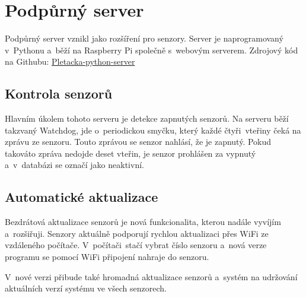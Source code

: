 \chapter{Podpůrný server}
Podpůrný server vznikl jako rozšíření pro senzory.
Server je naprogramovaný v~Pythonu a~běží na Raspberry Pi společně s~webovým serverem.\newline
Zdrojový kód na Githubu: \href{https://github.com/Pletacka-IoT/Pletacka-python-server}{Pletacka-python-server}\cite{PL_PY}


\section{Kontrola senzorů}
Hlavním úkolem tohoto serveru je detekce zapnutých senzorů.
Na serveru běží takzvaný Watchdog, jde o~periodickou smyčku, který každé čtyři~vteřiny čeká na zprávu ze senzoru.
Touto zprávou se senzor nahlásí, že je zapnutý. Pokud takováto zpráva nedojde deset vteřin, je senzor prohlášen za vypnutý a~v~databázi se označí jako neaktivní.


\section{Automatické aktualizace}
Bezdrátová aktualizace senzorů je nová funkcionalita, kterou nadále vyvíjím a~rozšiřuji.
Senzory aktuálně podporují rychlou aktualizaci přes WiFi ze vzdáleného počítače.
V~počítači~stačí vybrat číslo senzoru a~nová verze programu se pomocí WiFi připojení nahraje do senzoru.

V~nové verzi přibude také hromadná aktualizace senzorů a~systém na udržování aktuálních verzí systému ve všech senzorech.




\newpage